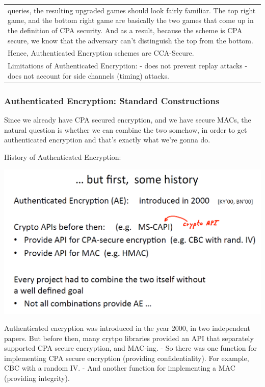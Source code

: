 \documentclass[11pt]{article}
\makeatletter
\def\maxwidth{\ifdim\Gin@nat@width>\linewidth\linewidth
    \else\Gin@nat@width\fi}
\let\Oldincludegraphics\includegraphics
\renewcommand{\includegraphics}[1]{\Oldincludegraphics[width=.8\maxwidth]{#1}}
\makeatother
\begin{document}
\begin{longtable}[]{@{}l@{}}
\begin{minipage}[t]{0.07\columnwidth}
queries, the resulting upgraded games should look fairly familiar. The
top right game, and the bottom right game are basically the two games
that come up in the definition of CPA security. And as a result, because
the scheme is CPA secure, we know that the adversary can't distinguish
the top from the bottom.\strut
\end{minipage}\tabularnewline
\begin{minipage}[t]{0.07\columnwidth}\raggedright
Hence, Authenticated Encryption schemes are CCA-Secure.\strut
\end{minipage}\tabularnewline
\begin{minipage}[t]{0.07\columnwidth}\raggedright
Limitations of Authenticated Encryption: - does not prevent replay
attacks - does not account for side channels (timing) attacks.\strut
\end{minipage}\tabularnewline
\bottomrule
\end{longtable}

    \hypertarget{authenticated-encryption-standard-constructions}{%
\subsubsection{Authenticated Encryption: Standard
Constructions}\label{authenticated-encryption-standard-constructions}}

Since we already have CPA secured encryption, and we have secure MACs,
the natural question is whether we can combine the two somehow, in order
to get authenticated encryption and that's exactly what we're gonna do.

History of Authenticated Encryption:

\includegraphics{./Images/AuthEncryp-History.png}

Authenticated encryption was introduced in the year 2000, in two
independent papers. But before then, many crytpo libraries provided an
API that separately supported CPA secure encryption, and MAC-ing. - So
there was one function for implementing CPA secure encryption (providing
confidentiality). For example, CBC with a random IV. - And another
function for implementing a MAC (providing integrity).
\end{document}
